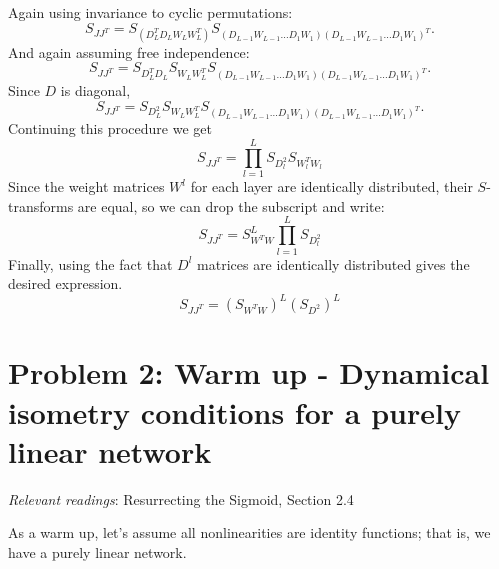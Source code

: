 \documentclass[a4paper]{article}
\begin{document}
\begin{enumerate}[label=(\alph*)]
\begin{tcolorbox}
Again using invariance to cyclic permutations:
$$ S_{JJ^T} = S_{(D_L^T D_L W_L W_L^T)} S_{(D_{L-1} W_{L-1} \ldots D_1 W_1)(D_{L-1} W_{L-1} \ldots D_1 W_1)^T}.$$
And again assuming free independence:
$$ S_{JJ^T} = S_{D_L^T D_L} S_{W_L W_L^T} S_{(D_{L-1} W_{L-1} \ldots D_1 W_1)(D_{L-1} W_{L-1} \ldots D_1 W_1)^T}.$$
Since $D$ is diagonal,
$$ S_{JJ^T} = S_{D_L^2} S_{W_L W_L^T} S_{(D_{L-1} W_{L-1} \ldots D_1 W_1)(D_{L-1} W_{L-1} \ldots D_1 W_1)^T}.$$
Continuing this procedure we get
$$ S_{JJ^T} = \prod_{l=1}^L S_{D_l^2} S_{W_l^T W_l} $$
Since the weight matrices $W^l$ for each layer are identically distributed, their $S$-transforms are equal, so we can drop the subscript and write:
$$ S_{JJ^T} =  S_{W^T W}^L \prod_{l=1}^L S_{D_l^2}$$
Finally, using the fact that $D^l$ matrices are identically distributed gives the desired expression.
$$ S_{JJ^T} =  \left(S_{W^T W}\right)^L \left(S_{D^2}\right)^L$$
\end{tcolorbox}
\end{enumerate}

\section*{Problem 2:  Warm up - Dynamical isometry conditions for a purely linear network}

\textit{Relevant readings}: Resurrecting the Sigmoid, Section 2.4

\vspace{5}
\noindent As a warm up, let's assume all nonlinearities are identity functions; that is, we have a purely linear network. 
\end{document}
